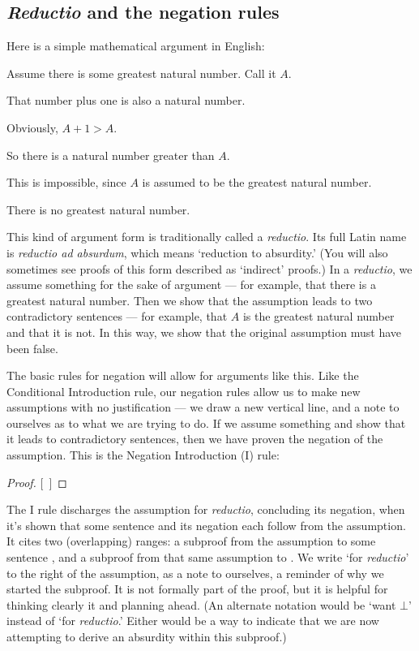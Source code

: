 \subsection{\emph{Reductio} and the negation rules}
Here is a simple mathematical argument in English:
\begin{earg}
\item[] Assume there is some greatest natural number. Call it $A$.
\item[] That number plus one is also a natural number.
\item[] Obviously, $A+1 > A$.
\item[] So there is a natural number greater than $A$.
\item[] This is impossible, since $A$ is assumed to be the greatest natural number.
\item[\therefore] There is no greatest natural number.
\end{earg}

This kind of argument form is traditionally called a \emph{reductio}. Its full Latin name is \emph{reductio ad absurdum}, which means `reduction to absurdity.' (You will also sometimes see proofs of this form described as `indirect' proofs.) In a \emph{reductio}, we assume something for the sake of argument --- for example, that there is a greatest natural number. Then we show that the assumption leads to two contradictory sentences --- for example, that $A$ is the greatest natural number and that it is not. In this way, we show that the original assumption must have been false.

The basic rules for negation will allow for arguments like this. Like the Conditional Introduction rule, our negation rules allow us to make new assumptions with no justification --- we draw a new vertical line, and a note to ourselves as to what we are trying to do. If we assume something and show that it leads to contradictory sentences, then we have proven the negation of the assumption. This is the Negation Introduction ({\enot}I) rule:

\begin{proof}
\open
	\metaA{}
	\metaB{}
\close
{}[\ ]{\enot\metaA{}}
\end{proof}

The {\enot}I rule discharges the assumption for \emph{reductio}, concluding its negation, when it's shown that some sentence and its negation each follow from the assumption. It cites two (overlapping) ranges: a subproof from the assumption to some sentence \metaB{}, and a subproof from that same assumption to \enot\metaB{}. We write `for \emph{reductio}' to the right of the assumption, as a note to ourselves, a reminder of why we started the subproof. It is not formally part of the proof, but it is helpful for thinking clearly it and planning ahead. (An alternate notation would be `want $\bot$' instead of `for \emph{reductio}.' Either would be a way to indicate that we are now attempting to derive an absurdity within this subproof.)

